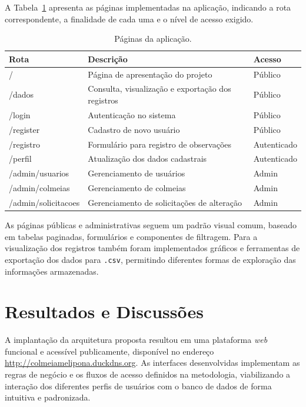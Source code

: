 \documentclass[12pt]{unisenaiclass}
\begin{document}
A Tabela~\ref{tab:paginas} apresenta as páginas implementadas na aplicação, indicando a rota correspondente, a finalidade de cada uma e o nível de acesso exigido.

\renewcommand{\arraystretch}{1.0}

\begin{longtable}{lp{5cm}l}
\caption{Páginas da aplicação.}
\label{tab:paginas}\\

\hline
\textbf{Rota} & \textbf{Descrição} & \textbf{Acesso} \\
\hline
/ & Página de apresentação do projeto & Público \\
/dados & Consulta, visualização e exportação dos registros & Público \\
/login & Autenticação no sistema & Público \\
/register & Cadastro de novo usuário & Público \\
/registro & Formulário para registro de observações & Autenticado \\
/perfil & Atualização dos dados cadastrais & Autenticado \\
/admin/usuarios & Gerenciamento de usuários & Admin \\
/admin/colmeias & Gerenciamento de colmeias & Admin \\
/admin/solicitacoes & Gerenciamento de solicitações de alteração & Admin \\
\hline
\end{longtable}

As páginas públicas e administrativas seguem um padrão visual comum, baseado em tabelas paginadas, formulários e componentes de filtragem. Para a visualização dos registros também foram implementados gráficos e ferramentas de exportação dos dados para \texttt{.csv}, permitindo diferentes formas de exploração das informações armazenadas.

\section{Resultados e Discussões}

A implantação da arquitetura proposta resultou em uma plataforma \textit{web} funcional e acessível publicamente, disponível no endereço \url{http://colmeiamelipona.duckdns.org}. As interfaces desenvolvidas implementam as regras de negócio e os fluxos de acesso definidos na metodologia, viabilizando a interação dos diferentes perfis de usuários com o banco de dados de forma intuitiva e padronizada.
\end{document}
